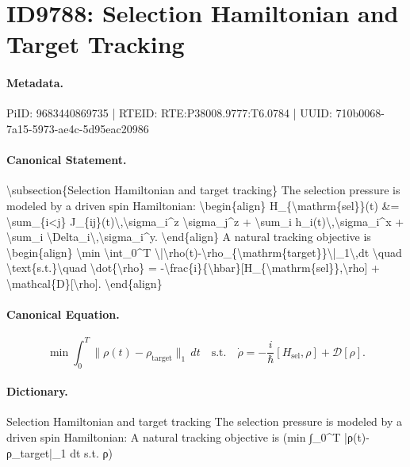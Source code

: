 \section*{ID9788: Selection Hamiltonian and Target Tracking}
\paragraph{Metadata.}
PiID: 9683440869735 | RTEID: RTE:P38008.9777:T6.0784 | UUID: 710b0068-7a15-5973-ae4c-5d95eac20986

\paragraph{Canonical Statement.}
\textbackslash{}subsection\{Selection Hamiltonian and target tracking\} The selection pressure is modeled by a driven spin Hamiltonian: \textbackslash{}begin\{align\} H\_\{\textbackslash{}mathrm\{sel\}\}(t) \&= \textbackslash{}sum\_\{i<j\} J\_\{ij\}(t)\textbackslash{},\textbackslash{}sigma\_i\textasciicircum{}z \textbackslash{}sigma\_j\textasciicircum{}z + \textbackslash{}sum\_i h\_i(t)\textbackslash{},\textbackslash{}sigma\_i\textasciicircum{}x + \textbackslash{}sum\_i \textbackslash{}Delta\_i\textbackslash{},\textbackslash{}sigma\_i\textasciicircum{}y. \textbackslash{}end\{align\} A natural tracking objective is \textbackslash{}begin\{align\} \textbackslash{}min \textbackslash{}int\_0\textasciicircum{}T \textbackslash{}|\textbackslash{}rho(t)-\textbackslash{}rho\_\{\textbackslash{}mathrm\{target\}\}\textbackslash{}|\_1\textbackslash{},dt \textbackslash{}quad \textbackslash{}text\{s.t.\}\textbackslash{}quad \textbackslash{}dot\{\textbackslash{}rho\} = -\textbackslash{}frac\{i\}\{\textbackslash{}hbar\}[H\_\{\textbackslash{}mathrm\{sel\}\},\textbackslash{}rho] + \textbackslash{}mathcal\{D\}[\textbackslash{}rho]. \textbackslash{}end\{align\}

\paragraph{Canonical Equation.}
\[
\min \int_0^T \|\rho(t)-\rho_{\mathrm{target}}\|_1\,dt \quad \text{s.t.}\quad \dot{\rho} = -\frac{i}{\hbar}[H_{\mathrm{sel}},\rho] + \mathcal{D}[\rho].
\]

\paragraph{Dictionary.}
Selection Hamiltonian and target tracking The selection pressure is modeled by a driven spin Hamiltonian: A natural tracking objective is (min ∫\_0\textasciicircum{}T |ρ(t)-ρ\_target|\_1 dt s.t. ρ)

